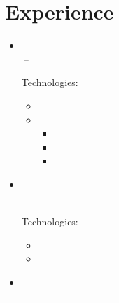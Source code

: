 \documentclass[11pt,a4paper]{article}
\begin{document}
\section{Experience}
\begin{itemize}[leftmargin=0pt,label={},itemsep=2em,topsep=0pt]
\item \parbox{\textwidth}{\textbf{\KhonraadName} \hfill \textit{\KhonraadLocation}}\\
\textit{\KhonraadThirdJobTitle} \hfill \textit{\KhonraadFirstJobStart\,--\,\KhonraadThirdJobEnd}

\vspace{0.2cm}
{\color{secondary}Technologies:} \KhonraadTechnology
\vspace{0.3cm}
\begin{itemize}[leftmargin=*,topsep=-6pt,parsep=0pt,partopsep=0pt,itemsep=0pt]
    \item \KhonraadJava
    \item \KhonraadInnovation
    \begin{itemize}[leftmargin=*,topsep=0pt,parsep=0pt,partopsep=0pt,itemsep=0pt,label={--}]
        \item \KhonraadMobile
        \item \KhonraadAndroid
        \item \KhonraadMPS
    \end{itemize}
\end{itemize} 


\item \parbox{\textwidth}{\textbf{\McfunshineName} \hfill \textit{\McfunshineLocation}}\\
\textit{\McfunshineJobTitle} \hfill \textit{\McfunshineJobStart\,--\,\McfunshineJobEnd}

\vspace{0.2cm}
{\color{secondary}Technologies:} \McfunshinePodmorphTechnology
\vspace{0.3cm}
\begin{itemize}[leftmargin=*,topsep=-6pt,parsep=0pt,partopsep=0pt,itemsep=0pt]
    \item \McfunshinePodmorph
    \item \McfunshinePodmorphAI
\end{itemize}


\item \parbox{\textwidth}{\textbf{\BakerName} \hfill \textit{\BakerLocation}}\\
\textit{\BakerFirstJobTitle} \hfill \textit{\BakerFirstJobStart\,--\,\BakerSecondJobEnd}


\end{itemize}
\end{document}
